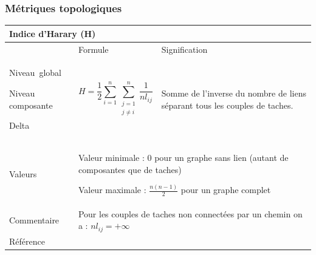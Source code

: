 \documentclass{article}
\begin{document}
\subsubsection{Métriques topologiques}

\begin{table}[H]
\begin{tabular}{|m{3.24cm}|m{4.4810004cm}m{7.924cm}|}

\hline
\multicolumn{3}{|m{16.044998cm}|}{Indice d’Harary (H)}\\\hline
 &
\multicolumn{1}{m{4.4810004cm}|}{Formule} &
Signification\\\hline
Niveau~global  

Niveau composante 

Delta &
\multicolumn{1}{m{4.4810004cm}|}{\begin{equation*}
H=\frac{1}{2}\sum _{i=1}^{n}{\sum _{\begin{matrix}j=1\\j{\neq}i\end{matrix}}^{n}{\frac{1}{{\mathit{nl}}_{\mathit{ij}}}}}
\end{equation*}
} &
Somme de l’inverse du nombre de liens séparant tous les couples de taches.

\\\hline
Valeurs &
\multicolumn{2}{m{12.6050005cm}|}{Valeur minimale : 0 pour un graphe sans lien (autant de composantes que de taches)

Valeur maximale : $\frac{n(n-1)}{2}$ pour un graphe complet

}\\\hline
Commentaire &
\multicolumn{2}{m{12.6050005cm}|}{Pour les couples de taches non connectées par un chemin on a :   ${\mathit{nl}}_{\mathit{ij}}=+{\infty}$}\\\hline
Référence &
\multicolumn{2}{m{12.6050005cm}|}{\cite{Ricotta2000}}\\\hline
\end{tabular}
\end{table}
\end{document}
